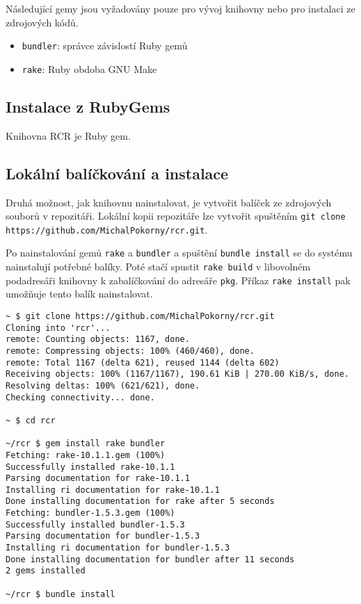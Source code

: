 \documentclass[a4paper]{article}
\def\githuburl{https://github.com/MichalPokorny/rcr.git}
\begin{document}
Následující gemy jsou vyžadovány pouze pro vývoj knihovny nebo pro instalaci
ze zdrojových kódů.
\begin{itemize}
\item \texttt{bundler}: správce závislostí Ruby gemů
\item \texttt{rake}: Ruby obdoba GNU Make
\end{itemize}

\subsection{Instalace z RubyGems}
Knihovna RCR je Ruby gem.

\subsection{Lokální balíčkování a instalace}
Druhá možnost, jak knihovnu nainstalovat, je vytvořit balíček ze zdrojových
souborů v repozitáři. Lokální kopii repozitáře lze vytvořit spuštěním
\texttt{git clone \githuburl}.

Po nainstalování gemů \texttt{rake} a \texttt{bundler} a spuštění
\texttt{bundle install} se do systému nainstalují potřebné balíky. Poté
stačí spustit \texttt{rake build} v libovolném podadresáři knihovny
k zabalíčkování do adresáře \texttt{pkg}. Příkaz \texttt{rake install} pak
umožňuje tento balík nainstalovat.

\begin{lstlisting}
~ $ git clone https://github.com/MichalPokorny/rcr.git
Cloning into 'rcr'...
remote: Counting objects: 1167, done.
remote: Compressing objects: 100% (460/460), done.
remote: Total 1167 (delta 621), reused 1144 (delta 602)
Receiving objects: 100% (1167/1167), 190.61 KiB | 270.00 KiB/s, done.
Resolving deltas: 100% (621/621), done.
Checking connectivity... done.

~ $ cd rcr

~/rcr $ gem install rake bundler
Fetching: rake-10.1.1.gem (100%)
Successfully installed rake-10.1.1
Parsing documentation for rake-10.1.1
Installing ri documentation for rake-10.1.1
Done installing documentation for rake after 5 seconds
Fetching: bundler-1.5.3.gem (100%)
Successfully installed bundler-1.5.3
Parsing documentation for bundler-1.5.3
Installing ri documentation for bundler-1.5.3
Done installing documentation for bundler after 11 seconds
2 gems installed

~/rcr $ bundle install
\end{lstlisting}
\end{document}
